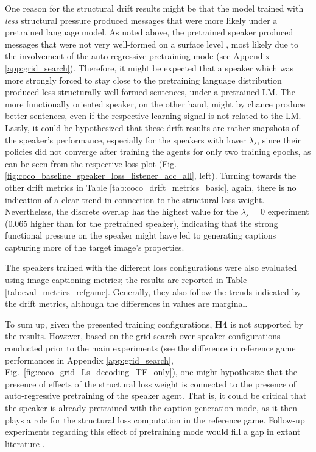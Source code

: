 One reason for the structural drift results might be that the model trained with \emph{less} structural pressure produced messages that were more likely under a pretrained language model. As noted above, the pretrained speaker produced messages that were not very well-formed on a surface level , most likely due to the involvement of the auto-regressive pretraining mode (see Appendix \ref{app:grid_search}). Therefore, it might be expected that a speaker which was more strongly forced to stay close to the pretraining language distribution produced less structurally well-formed sentences, under a pretrained LM. The more functionally oriented speaker, on the other hand, might by chance produce better sentences, even if the respective learning signal is not related to the LM. Lastly, it could be hypothesized that these drift results are rather snapshots of the speaker's performance, especially for the speakers with lower $\lambda_s$, since their policies did not converge after training the agents for only two training epochs, as can be seen from the respective loss plot (Fig. \ref{fig:coco_baseline_speaker_loss_listener_acc_all}, left). 
Turning towards the other drift metrics in Table \ref{tab:coco_drift_metrics_basic}, again, there is no indication of a clear trend in connection to the structural loss weight. Nevertheless, the discrete overlap has the highest value for the $\lambda_s = 0$ experiment (0.065 higher than for the pretrained speaker), indicating that the strong functional pressure on the speaker might have led to generating captions capturing more of the target image's properties.

The speakers trained with the different loss configurations were also evaluated using image captioning metrics; the results are reported in Table \ref{tab:eval_metrics_refgame}. Generally, they also follow the trends indicated by the drift metrics, although the differences in values are marginal.

To sum up, given the presented training configurations, \textbf{H4} is not supported by the results. However, based on the grid search over speaker configurations conducted prior to the main experiments (see the difference in reference game performances in Appendix \ref{app:grid_search}, Fig.~\ref{fig:coco_grid_Ls_decoding_TF_only}), one might hypothesize that the presence of effects of the structural loss weight is connected to the presence of auto-regressive pretraining of the speaker agent. That is, it could be critical that the speaker is already pretrained with the caption generation mode, as it then plays a role for the structural loss computation in the reference game. Follow-up experiments regarding this effect of pretraining mode would fill a gap in extant literature \parencite[but see][for related work]{lowe2020interaction}.

